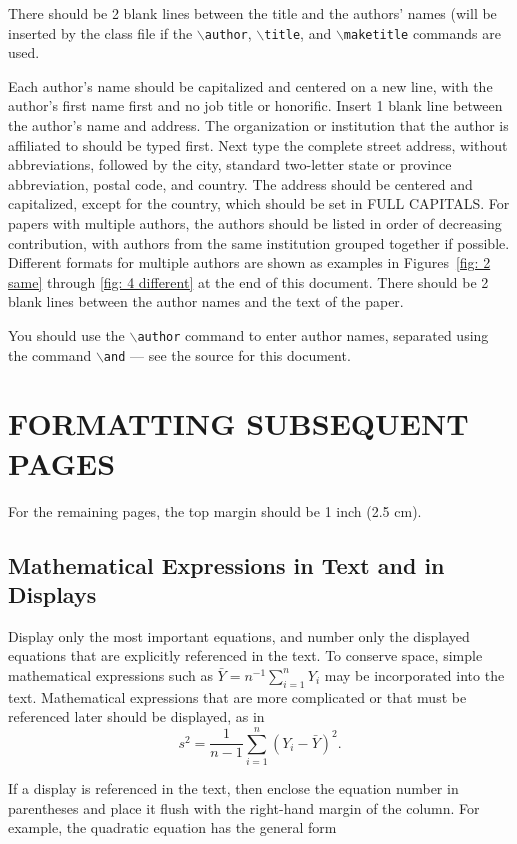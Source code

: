 \documentclass{wscpaperproc}
\theoremstyle{wsc}
\begin{document}
There should be 2 blank lines between the title and the authors' names (will be inserted by the class file if the {\tt $\backslash$author}, {\tt $\backslash$title}, and {\tt $\backslash$maketitle} commands are used.

Each author's name should be capitalized and centered on a new line, with the author's first name first and no job title or honorific.
Insert 1 blank line between the author's name and address. The organization or institution that the author is affiliated to should be typed first.
Next type the complete street address, without abbreviations, followed by the city, standard two-letter state or province abbreviation, postal code, and country.
The address should be centered and capitalized, except for the country, which should be set in FULL CAPITALS.
For papers with multiple authors, the authors should be listed in order of decreasing contribution, with authors from the same institution grouped together if possible.
Different formats for multiple authors are shown as examples in Figures~\ref{fig: 2 same} through \ref{fig: 4 different} at the end of this document.
There should be 2 blank lines between the author names and the text of the paper.

You should use the {\tt $\backslash$author} command to enter author names, separated using the command {\tt $\backslash$and} --- see the source for this document.

\section{FORMATTING SUBSEQUENT PAGES}
For the remaining pages, the top margin should be 1 inch (2.5 cm).

\subsection{Mathematical Expressions in Text and in Displays}
Display only the most important equations, and number only the displayed equations that are explicitly referenced in the text.
To conserve space, simple mathematical expressions such as $\bar Y = n^{-1} \sum_{i=1}^n Y_i$ may be incorporated into the text.
Mathematical expressions that are more complicated or that must be referenced later should be displayed, as in
$$s^2 = \frac 1 {n-1} \sum_{i=1}^n (Y_i - \bar Y)^2.$$

If a display is referenced in the text, then enclose the equation number in parentheses and place it flush with the right-hand margin of the
column. For example, the quadratic equation has the general form
\end{document}
